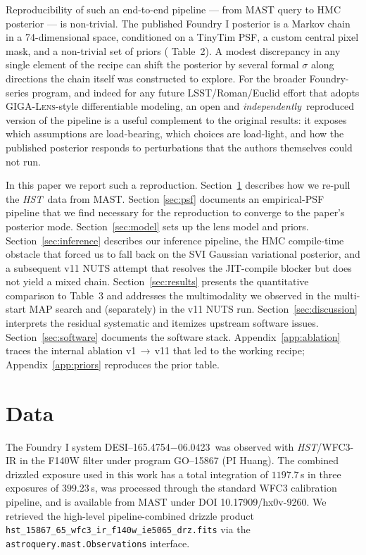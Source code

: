 \documentclass[11pt,letterpaper]{article}
\newcommand{\foundry}{DESI--165.4754$-$06.0423}
\newcommand{\gigalens}{\textsc{GIGA-Lens}}
\begin{document}
Reproducibility of such an end-to-end pipeline --- from MAST query to
HMC posterior --- is non-trivial. The published Foundry I posterior is
a Markov chain in a 74-dimensional space, conditioned on a TinyTim PSF,
a custom central pixel mask, and a non-trivial set of priors
(\citealt{huang2025foundry1} Table~2). A modest discrepancy in any
single element of the recipe can shift the posterior by several formal
$\sigma$ along directions the chain itself was constructed to explore.
For the broader Foundry-series program, and indeed for any future
LSST/Roman/Euclid effort that adopts \gigalens-style differentiable
modeling, an open and {\it independently}\ reproduced version of the
pipeline is a useful complement to the original results: it
exposes which assumptions are load-bearing, which choices are
load-light, and how the published posterior responds to perturbations
that the authors themselves could not run.

In this paper we report such a reproduction. Section~\ref{sec:data}
describes how we re-pull the {\it HST}\ data from MAST. Section
\ref{sec:psf} documents an empirical-PSF pipeline that we find
necessary for the reproduction to converge to the paper's posterior
mode. Section~\ref{sec:model} sets up the lens model and priors.
Section~\ref{sec:inference} describes our inference pipeline, the
HMC compile-time obstacle that forced us to fall back on the SVI
Gaussian variational posterior, and a subsequent v11 NUTS attempt that
resolves the JIT-compile blocker but does not yield a mixed chain.
Section~\ref{sec:results} presents the quantitative comparison to
\citet{huang2025foundry1} Table~3 and addresses the multimodality we
observed in the multi-start MAP search and (separately) in the v11
NUTS run. Section~\ref{sec:discussion} interprets the residual systematic
and itemizes upstream software issues. Section~\ref{sec:software}
documents the software stack. Appendix~\ref{app:ablation} traces the
internal ablation v1\,$\to$\,v11 that led to the working recipe;
Appendix~\ref{app:priors} reproduces the prior table.

\section{Data}
\label{sec:data}

The Foundry I system \foundry\ was observed with {\it HST}/WFC3-IR in the
F140W filter under program GO--15867 (PI Huang). The combined drizzled
exposure used in this work has a total integration of $1197.7\,$s in
three exposures of $399.23\,$s, was processed through the standard
WFC3 calibration pipeline, and is available from MAST under DOI
10.17909/hx0v-9260. We retrieved the high-level pipeline-combined
drizzle product \texttt{hst\_15867\_65\_wfc3\_ir\_f140w\_ie5065\_drz.fits}
via the \texttt{astroquery.mast.Observations} interface.
\end{document}
